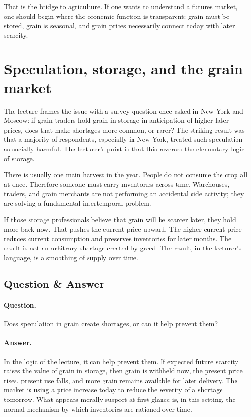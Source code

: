 That is the bridge to agriculture. If one wants to understand a futures market, one should begin where the economic function is transparent: grain must be stored, grain is seasonal, and grain prices necessarily connect today with later scarcity.

\section{Speculation, storage, and the grain market}

The lecture frames the issue with a survey question once asked in New York and Moscow: if grain traders hold grain in storage in anticipation of higher later prices, does that make shortages more common, or rarer? The striking result was that a majority of respondents, especially in New York, treated such speculation as socially harmful. The lecturer's point is that this reverses the elementary logic of storage.

There is usually one main harvest in the year. People do not consume the crop all at once. Therefore someone must carry inventories across time. Warehouses, traders, and grain merchants are not performing an accidental side activity; they are solving a fundamental intertemporal problem.

If those storage professionals believe that grain will be scarcer later, they hold more back now. That pushes the current price upward. The higher current price reduces current consumption and preserves inventories for later months. The result is not an arbitrary shortage created by greed. The result, in the lecturer's language, is a smoothing of supply over time.

\subsection{Question \& Answer}

\paragraph{Question.} Does speculation in grain create shortages, or can it help prevent them?

\paragraph{Answer.} In the logic of the lecture, it can help prevent them. If expected future scarcity raises the value of grain in storage, then grain is withheld now, the present price rises, present use falls, and more grain remains available for later delivery. The market is using a price increase today to reduce the severity of a shortage tomorrow. What appears morally suspect at first glance is, in this setting, the normal mechanism by which inventories are rationed over time.

